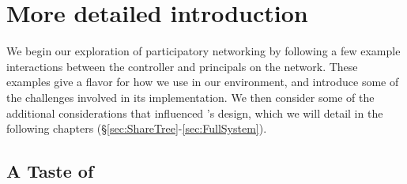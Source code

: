
\chapter{More detailed introduction}


We begin our exploration of participatory networking by following a few
example interactions between the \sys controller and principals on the
network. These examples give a
flavor for how we use \sys in our environment, and introduce some of
the challenges involved in its implementation.
We then consider some of the additional considerations that influenced
\sys's design, which we will detail in the following chapters
(\S\ref{sec:ShareTree}-\ref{sec:FullSystem}).

\section{A Taste of \sys}

